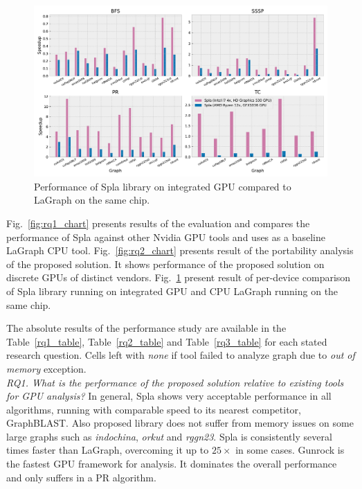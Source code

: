 \begin{figure}[tbp]
\centering
\includegraphics[width=1.0\linewidth]{plots/rq3_int.pdf}
\caption{Performance of Spla library on integrated GPU compared to LaGraph on the same chip.}
\label{fig:rq3_chart}
\end{figure}

Fig.~\ref{fig:rq1_chart} presents results of the evaluation and compares the performance of Spla against other Nvidia GPU tools and uses as a baseline LaGraph CPU tool. 
Fig.~\ref{fig:rq2_chart} presents result of the portability analysis of the proposed solution. It shows performance of the proposed solution on discrete GPUs of distinct vendors.
Fig.~\ref{fig:rq3_chart} present result of per-device comparison of Spla library running on integrated GPU and CPU LaGraph running on the same chip. 

The absolute results of the performance study are available in the Table~\ref{rq1_table}, Table~\ref{rq2_table} and Table~\ref{rq3_table} for each stated research question. Cells left with \textit{none} if tool failed to analyze graph due to \textit{out of memory} exception.\\

\textit{RQ1. What is the performance of the proposed solution relative to existing tools for GPU analysis?} In general, Spla shows very acceptable performance in all algorithms, running with comparable speed to its nearest competitor, GraphBLAST. Also proposed library does not suffer from memory issues on some large graphs such as \textit{indochina}, \textit{orkut} and \textit{rggn23}. Spla is consistently several times faster than LaGraph, overcoming it up to $25\times$ in some cases. Gunrock is the fastest GPU framework for analysis. It dominates the overall performance and only suffers in a PR algorithm.

